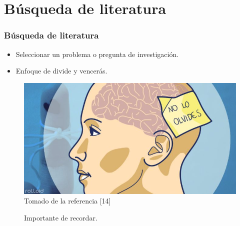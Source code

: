 \documentclass{beamer}
\begin{document}
\section{B\'usqueda de literatura} 
 \begin{frame}\frametitle{B\'usqueda de literatura}
    \begin{multicols}{2}  
        \begin{itemize}
            \item Seleccionar un problema o pregunta de investigaci\'on.
            \item Enfoque de divide y vencer\'as.
        \end{itemize} 
        \begin{figure}
                \includegraphics[scale=0.25]{figures/recordar}
                \newline
                {\tiny Tomado de la referencia [14] }
                \caption{Importante de recordar. }
            \end{figure}
        \end{multicols}
    \end{frame}
\end{document}
